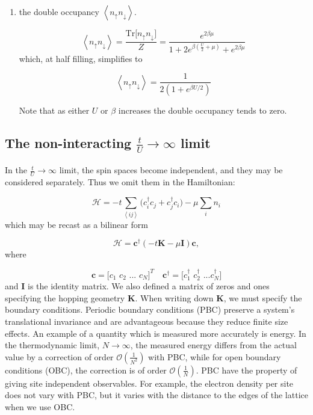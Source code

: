 \documentclass[10pt, twocolumn, twoside]{article}
\begin{document}
\begin{enumerate}
\item the double occupancy $\left\langle n_\uparrow n_\downarrow \right\rangle$.

\begin{equation}
\left\langle n_\uparrow n_\downarrow \right\rangle = \frac{\text{Tr} \big[ n_\uparrow n_\downarrow \big]}{Z} = \frac{e^{2\beta\mu}}{1 + 2 e^{\beta (\frac{U}{2} + \mu )} + e^{2\beta\mu}}
\end{equation}
which, at half filling, simplifies to

\begin{equation}
\left\langle n_\uparrow n_\downarrow \right\rangle = \frac{1}{2 ( 1 + e^{\beta U/2} )}
\end{equation}

Note that as either $U$ or $\beta$ increases the double occupancy tends to zero.
\end{enumerate}

\subsection{The non-interacting $\frac{t}{U} \rightarrow \infty$ limit}\paragraph{}

In the $\frac{t}{U} \rightarrow \infty$ limit, the spin spaces become independent, and they may be considered separately. Thus we omit them in the Hamiltonian:

\begin{equation}
\mathcal{H} = -t \sum_{\left\langle i j \right\rangle} \big( c_i^\dagger c_j + c_j^\dagger c_i \big) - \mu \sum_i n_i
\end{equation}
which may be recast as a bilinear form

\begin{equation}
\mathcal{H} = \bm c^\dagger ( -t \bm K - \mu \bm I ) \bm c ,
\end{equation}
where

\begin{equation}
\bm c = \bigg[ c_1 \,\, c_2 \,\, ... \,\, c_N \bigg]^T \quad \bm c^\dagger = \bigg[c_1^\dagger \,\, c_2^\dagger \,\, ... c_N^\dagger \bigg]
\end{equation}
and $\bm I$ is the identity matrix. We also defined a matrix of zeros and ones specifying the hopping geometry $\bm K$. When writing down $\bm K$, we must specify the boundary conditions. Periodic boundary conditions (PBC) preserve a system's translational invariance and are advantageous because they reduce finite size effects. An example of a quantity which is measured more accurately is energy. In the thermodynamic limit, $N \rightarrow \infty$, the measured energy differs from the actual value by a correction of order $\mathcal{O}(\frac{1}{N^2})$ with PBC, while for open boundary conditions (OBC), the correction is of order $\mathcal{O}(\frac{1}{N})$. PBC have the property of giving site independent observables. For example, the electron density per site does not vary with PBC, but it varies with the distance to the edges of the lattice when we use OBC.
\end{document}
